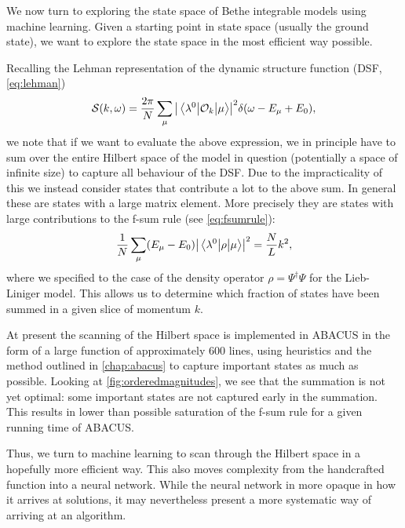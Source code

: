 \documentclass[11pt, a4paper]{report} %
\begin{document}
We now turn to exploring the state space of Bethe integrable models using machine learning.
Given a starting point in state space (usually the ground state), we want to explore the state space in the most efficient way possible.

Recalling the Lehman representation of the dynamic structure function (DSF, \cref{eq:lehman})
\begin{equation}
  \mathcal{S}(k,\omega) = \frac{2\pi}{N}\sum_{\mu}\abs{\mel{\lambda^0}{\mathcal{O}_k}{\mu}}^2 \delta(\omega-E_{\mu}+E_0), 
\end{equation}
we note that if we want to evaluate the above expression, we in principle have to sum over the entire Hilbert space of the model in question (potentially a space of  infinite size) to capture all behaviour of the DSF.
Due to the impracticality of this we instead consider states that contribute a lot to the above sum.
In general these are states with a large matrix element.
More precisely they are states with large contributions to the f-sum rule (see \cref{eq:fsumrule}):
\begin{align}
  \frac{1}{N}\sum_{\mu}(E_{\mu}-E_0)\abs{\mel{\lambda^0}{\rho}{\mu}}^2  = \frac{N}{L} k^2,
\end{align}
where we specified to the case of the density operator \(\rho = \Psi^{\dag}\Psi\) for the Lieb-Liniger model.
This allows us to determine which fraction of states have been summed in a given slice of momentum \(k\).

At present the scanning of the Hilbert space is implemented in ABACUS in the form of a large function of approximately 600 lines, using heuristics and the method outlined in \cref{chap:abacus} to capture important states as much as possible.
Looking at \cref{fig:orderedmagnitudes}, we see that the summation is not yet optimal: some important states are not captured early in the summation.
This results in lower than possible saturation of the f-sum rule for a given running time of ABACUS.

Thus, we turn to machine learning to scan through the Hilbert space in a hopefully more efficient way.
This also moves complexity from the handcrafted function into a neural network.
While the neural network in more opaque in how it arrives at solutions, it may nevertheless present a more systematic way of arriving at an algorithm.
\end{document}

